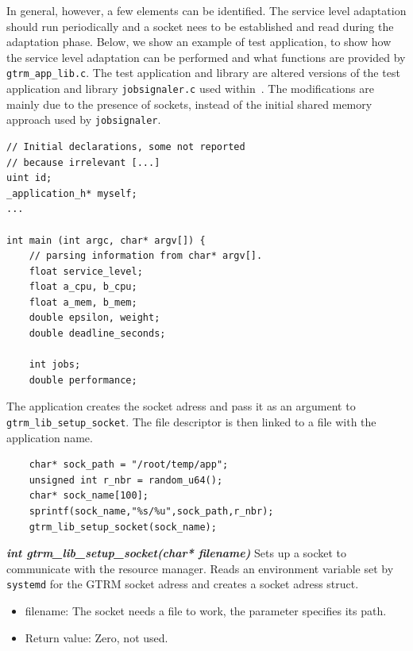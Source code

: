 \documentclass[nobiblatex]{LTHthesis}
\begin{document}
In general, however, a few elements can be identified. The service level
adaptation should run periodically and a socket nees to be established
and read during the adaptation phase. Below, we show an example of
test application, to show how the service level adaptation can be performed
and what functions are provided by \texttt{gtrm\_app\_lib.c}.
The test application and library are altered versions of the test 
application and library \texttt{jobsignaler.c} used within~\cite{gtrm}.
The modifications are mainly due to the presence of sockets, instead of
the initial shared memory approach used by \texttt{jobsignaler}.

\begin{lstlisting}
// Initial declarations, some not reported
// because irrelevant [...]
uint id;
_application_h* myself;
...	

int main (int argc, char* argv[]) {
	// parsing information from char* argv[].
	float service_level;
	float a_cpu, b_cpu;
	float a_mem, b_mem;
	double epsilon, weight;
	double deadline_seconds;
	
	int jobs;
	double performance;
\end{lstlisting}

The application creates the socket adress and pass it as an argument to 
\texttt{gtrm\_lib\_setup\_socket}. The file descriptor is then linked to
a file with the application name.
\begin{lstlisting}
	char* sock_path = "/root/temp/app";
	unsigned int r_nbr = random_u64();
	char* sock_name[100];
	sprintf(sock_name,"%s/%u",sock_path,r_nbr);
	gtrm_lib_setup_socket(sock_name);
\end{lstlisting}

\begin{framed}
	\begin{flushleft}		
		\emph{\textbf{{int gtrm\_lib\_setup\_socket(char* filename)}}}
		Sets up a socket to communicate with the resource manager. 
    Reads an environment variable set by \texttt{systemd} for the GTRM
    socket adress and creates a socket adress struct.
		\begin{itemize}
		\item filename: The socket needs a file to work, the parameter 
      specifies its path.
		\item Return value: Zero, not used.
		\end{itemize}
	\end{flushleft}
\end{framed}
\end{document}

